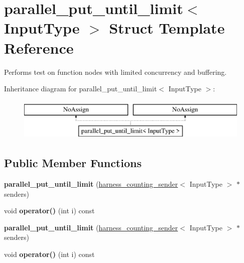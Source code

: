 \hypertarget{structparallel__put__until__limit}{}\section{parallel\+\_\+put\+\_\+until\+\_\+limit$<$ Input\+Type $>$ Struct Template Reference}
\label{structparallel__put__until__limit}


Performs test on function nodes with limited concurrency and buffering.  


Inheritance diagram for parallel\+\_\+put\+\_\+until\+\_\+limit$<$ Input\+Type $>$\+:\begin{figure}[H]
\begin{center}
\leavevmode
\includegraphics[height=2.000000cm]{structparallel__put__until__limit}
\end{center}
\end{figure}
\subsection*{Public Member Functions}
\begin{DoxyCompactItemize}
\item 
\hypertarget{structparallel__put__until__limit_a2f682e794569050736334ff4a3f4a0d9}{}{\bfseries parallel\+\_\+put\+\_\+until\+\_\+limit} (\hyperlink{structharness__counting__sender}{harness\+\_\+counting\+\_\+sender}$<$ Input\+Type $>$ $\ast$senders)\label{structparallel__put__until__limit_a2f682e794569050736334ff4a3f4a0d9}

\item 
\hypertarget{structparallel__put__until__limit_a194aadfe587a5d18f80169c904b69750}{}void {\bfseries operator()} (int i) const \label{structparallel__put__until__limit_a194aadfe587a5d18f80169c904b69750}

\item 
\hypertarget{structparallel__put__until__limit_a2f682e794569050736334ff4a3f4a0d9}{}{\bfseries parallel\+\_\+put\+\_\+until\+\_\+limit} (\hyperlink{structharness__counting__sender}{harness\+\_\+counting\+\_\+sender}$<$ Input\+Type $>$ $\ast$senders)\label{structparallel__put__until__limit_a2f682e794569050736334ff4a3f4a0d9}

\item 
\hypertarget{structparallel__put__until__limit_a194aadfe587a5d18f80169c904b69750}{}void {\bfseries operator()} (int i) const \label{structparallel__put__until__limit_a194aadfe587a5d18f80169c904b69750}

\end{DoxyCompactItemize}
